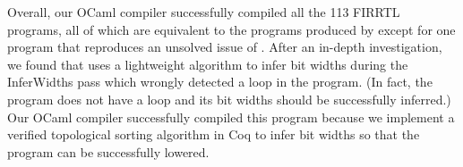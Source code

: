 \begin{table}[t]\setlength{\tabcolsep}{3pt}
\caption{Results of the compiler conformance testing}\small  \vspace{-3mm} %
\label{tab:compilerconformancetesting}
\end{table}
 	 	 	

Overall, our OCaml {\firrtl} compiler successfully compiled all the 113 FIRRTL programs, all of which
are equivalent to the programs produced by {\firtool} except for one {\firrtl} program that reproduces an unsolved issue of {\firtool}.
After an in-depth investigation, we found that {\firtool} uses a lightweight %
algorithm to infer bit widths during the InferWidths pass which wrongly detected a loop in the program.
(In fact, the program does not have a loop and its bit widths should be successfully inferred.)
Our OCaml {\firrtl} compiler successfully compiled this program because we implement a verified topological sorting algorithm in Coq to infer bit widths
so that the {\firrtl} program can be successfully lowered.



